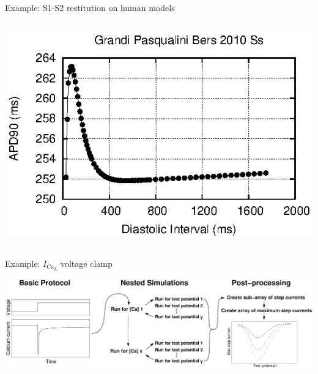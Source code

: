 \documentclass[t,xcolor={usenames,dvipsnames}]{beamer}
\begin{document}
\begin{frame}{Example: S1-S2 restitution on human models}
\begin{columns}[T]
\begin{column}{.33\linewidth}
\begin{center}
\vspace{.1cm}
\includegraphics[width=\textwidth]{grandi_pasqualini_bers_2010_ss_s1s2_curve}
\end{center}
\end{column}
\end{columns}
\end{frame}

\begin{frame}{Example: $I_{\textrm{Ca}_L}$ voltage clamp}
\begin{center}
\includegraphics[width=\textwidth]{ICaLIntro}
\end{center}
\end{frame}
\end{document}
